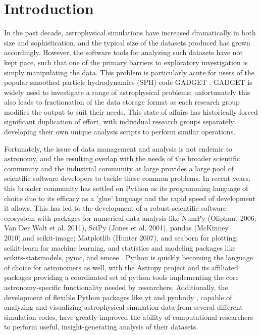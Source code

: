 \section{Introduction}
\label{intro}

In the past decade, astrophysical simulations have increased dramatically in both size and sophistication, and the typical size of the datasets produced has grown accordingly.  
However, the software tools for analyzing such datasets have not kept pace, such that one of the primary barriers to exploratory investigation is simply manipulating the data.  
This problem is particularly acute for users of the popular smoothed particle hydrodynamics (SPH) code GADGET \citep{SpringelYoshidaWhite2001,Springel2005}.  
GADGET is widely used to investigate a range of astrophysical problems; unfortunately this also leads to fractionation of the data storage format as each research group modifies the output to suit their needs.
This state of affairs has historically forced significant duplication of effort, with individual research groups separately developing their own unique analysis scripts to perform similar operations.

Fortunately, the issue of data management and analysis is not endemic to astronomy, and the resulting overlap with the needs of the broader scientific community and the industrial community at large provides a large pool of scientific software developers to tackle these common problems.
In recent years, this broader community has settled on Python as its programming language of choice due to its efficacy as a 'glue' language and the rapid speed of development it allows.  
This has led to the development of a robust scientific software ecosystem with packages for numerical data analysis like NumPy (Oliphant 2006; Van Der Walt et al. 2011), SciPy (Jones et al. 2001), pandas (McKinney 2010),and scikit-image; Matplotlib (Hunter 2007), and seaborn for plotting; scikit-learn for machine learning, and statistics and modeling packages like scikits-statsmodels, pymc, and emcee \citep{Foreman-Mackeyetal2013}.
Python is quickly becoming the language of choice for astronomers as well, with the Astropy project \citep{Robitailleetal2013} and its affiliated packages providing a coordinated set of python tools implementing the core astronomy-specific functionality needed by researchers. 
Additionally, the development of flexible Python packages like yt \citep{Turketal2011} and pynbody \citep{Pontzenetal2013}, capable of analyzing and visualizing astrophysical simulation data from several different simulation codes, have greatly improved the ability of computational researchers to perform useful, insight-generating analysis of their datasets.

